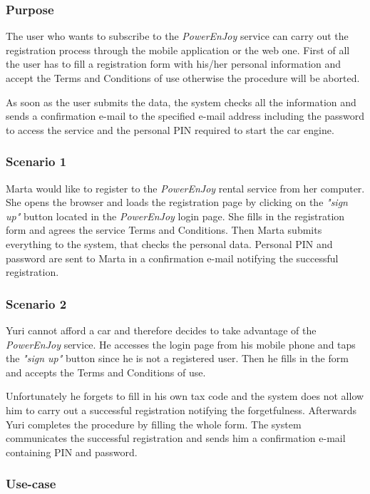 \subsubsection{Purpose}
The user who wants to subscribe to the \emph{PowerEnJoy} service can carry out the registration process through the mobile application or the web one. First of all the user has to fill a registration form with his/her personal information and accept the Terms and Conditions of use otherwise the procedure will be aborted.

As soon as the user submits the data, the system checks all the information and sends a confirmation e-mail to the specified e-mail address including the password to access the service and the personal PIN required to start the car engine.

\subsubsection{Scenario 1}
Marta would like to register to the \emph{PowerEnJoy} rental service from her computer. She opens the browser and loads the registration page by clicking on the \emph{"sign up"} button located in the \emph{PowerEnJoy} login page. She fills in the registration form and agrees the service Terms and Conditions. Then Marta submits everything to the system, that checks the personal data. Personal PIN and password are sent to Marta in a confirmation e-mail notifying the successful registration.

\subsubsection{Scenario 2}
Yuri cannot afford a car and therefore decides to take advantage of the \emph{PowerEnJoy} service. He accesses the login page from his mobile phone and taps the \emph{"sign up"} button since he is not a registered user. Then he fills in the form and accepts the Terms and Conditions of use.

Unfortunately he forgets to fill in his own tax code and the system does not allow him to carry out a successful registration notifying the forgetfulness. Afterwards Yuri completes the procedure by filling the whole form. The system communicates the successful registration and sends him a confirmation e-mail containing PIN and password.

\subsubsection{Use-case}

